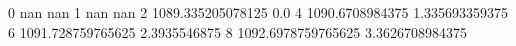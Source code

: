 0 nan nan
1 nan nan
2 1089.335205078125 0.0
4 1090.6708984375 1.335693359375
6 1091.728759765625 2.3935546875
8 1092.6978759765625 3.3626708984375
